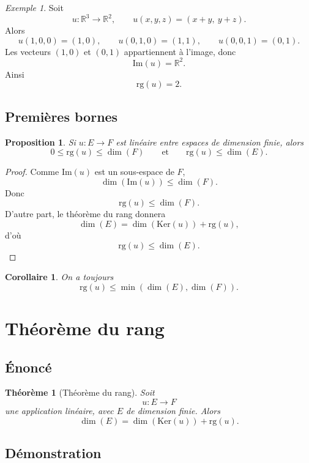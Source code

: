 \documentclass[11pt,a4paper]{article}
\newtheorem{theoreme}[definition]{Théorème}
\newtheorem{proposition}[definition]{Proposition}
\newtheorem{corollaire}[definition]{Corollaire}
\theoremstyle{remark}
\newtheorem{exemple}[definition]{Exemple}
\newcommand{\R}{\mathbb{R}}
\newcommand{\Ker}{\mathrm{Ker}}
\newcommand{\Img}{\mathrm{Im}}
\newcommand{\rg}{\mathrm{rg}}
\begin{document}
\begin{exemple}
Soit
\[
u:\R^3\to\R^2,\qquad u(x,y,z)=(x+y,\ y+z).
\]
Alors
\[
u(1,0,0)=(1,0),\qquad u(0,1,0)=(1,1),\qquad u(0,0,1)=(0,1).
\]
Les vecteurs \((1,0)\) et \((0,1)\) appartiennent à l’image, donc
\[
\Img(u)=\R^2.
\]
Ainsi
\[
\rg(u)=2.
\]
\end{exemple}

\subsection{Premières bornes}

\begin{proposition}
Si \(u:E\to F\) est linéaire entre espaces de dimension finie, alors
\[
0\le \rg(u)\le \dim(F)
\qquad \text{et} \qquad
\rg(u)\le \dim(E).
\]
\end{proposition}

\begin{proof}
Comme \(\Img(u)\) est un sous-espace de \(F\),
\[
\dim(\Img(u))\le \dim(F).
\]
Donc
\[
\rg(u)\le \dim(F).
\]
D’autre part, le théorème du rang donnera
\[
\dim(E)=\dim(\Ker(u))+\rg(u),
\]
d’où
\[
\rg(u)\le \dim(E).
\]
\end{proof}

\begin{corollaire}
On a toujours
\[
\rg(u)\le \min(\dim(E),\dim(F)).
\]
\end{corollaire}

\section{Théorème du rang}

\subsection{Énoncé}

\begin{theoreme}[Théorème du rang]
Soit
\[
u:E\to F
\]
une application linéaire, avec \(E\) de dimension finie. Alors
\[
\dim(E)=\dim(\Ker(u))+\rg(u).
\]
\end{theoreme}

\subsection{Démonstration}
\end{document}
